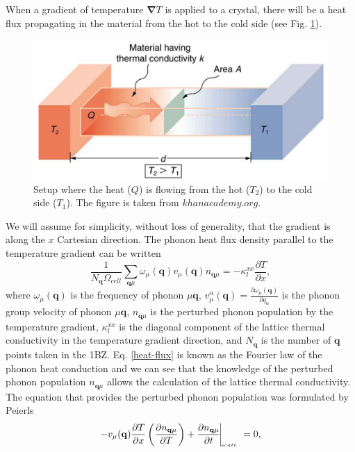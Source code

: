 When a gradient of temperature $\boldsymbol{\nabla}T$ is applied to a crystal, there will be a heat flux propagating in the material from the hot to the cold side (see Fig. \ref{heatflow}). 
\begin{figure}[h]
\begin{center}
\includegraphics[width=0.8\linewidth]{Figures/heat-flow.png}
\caption[Heat flow from the hot to the cold side]{Setup where the heat ($Q$) is flowing from the hot ($T_{2}$) to the cold side ($T_{1}$). The figure is taken from \color{blue}$khanacademy.org$.}
\label{heatflow}
\end{center}
\end{figure}
\color{black}
We will assume for simplicity, without loss of generality, that the gradient 
is along the $x$ Cartesian direction. The phonon heat flux density parallel to the temperature gradient can be written\cite{fugallo2013ab}
\begin{equation}
 \label{heat-flux}
 \frac{1}{N_{\mathbf{q}}\Omega_{cell}}\sum_{\mathbf{q}\mu}\omega_{\mu}(\mathbf{q})v_{\mu}(\mathbf{q})n_{\mathbf{q}\mu}=-\kappa_{l}^{xx}\frac{\partial T}{\partial x},
\end{equation}   
where $\omega_{\mu}(\mathbf{q})$ is the frequency of phonon $\mu\mathbf{q}$, $v_{\mu}^{\alpha}(\mathbf{q})=\frac{\partial\omega_{\mu}(\mathbf{q})}{\partial q_{\alpha}}$ is the phonon group velocity 
of phonon $\mu\mathbf{q}$, $n_{\mathbf{q}\mu}$ is the perturbed phonon population by the temperature gradient, $\kappa_{l}^{xx}$ is the diagonal component of the lattice thermal conductivity in the temperature 
gradient direction, and $N_{\mathbf{q}}$ is the number of $\mathbf{q}$ points taken in the 1BZ. Eq. \ref{heat-flux} is known as the Fourier law of the phonon heat conduction and we can see that the knowledge of 
the perturbed phonon population $n_{\mathbf{q}\mu}$ allows the calculation of the lattice thermal conductivity. The equation that provides the perturbed phonon population was formulated by Peierls\cite{peierls1929kinetischen}
\begin{equation}
 \label{bte}
 -v_{\mu}(\mathbf{q})\frac{\partial T}{\partial x}\left(\frac{\partial n_{\mathbf{q}\mu}}{\partial T}\right)+\frac{\partial n_{\mathbf{q}\mu}}{\partial t}\vline_{_{_{_{_{_{_{_{_{scatt}}}}}}}}}=0,
\end{equation} 

